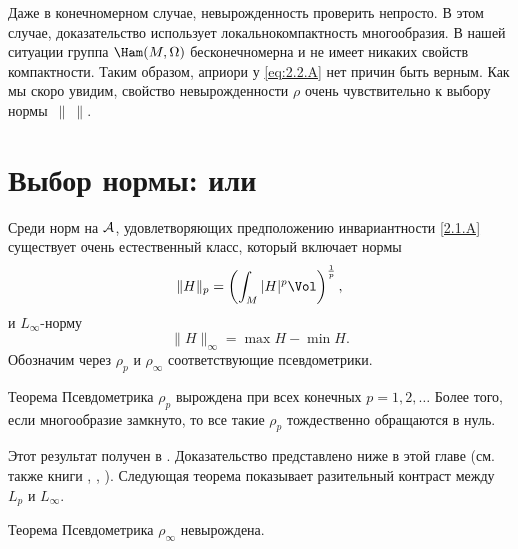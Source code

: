 Даже в конечномерном случае, невырожденность проверить непросто.
В этом случае, доказательство использует локальнокомпактность многообразия.
В нашей ситуации группа $\Ham (M, \Omega)$ бесконечномерна и не имеет никаких свойств компактности.
Таким образом, априори у \ref{eq:2.2.A} нет причин быть верным.
Как мы скоро увидим, свойство невырожденности $\rho$ очень чувствительно к выбору нормы~$\|\ \|$.

\section[\texorpdfstring{Выбор нормы: $L_p$ или $L_\infty$}{Выбор нормы: Lₚ или L∞}]{Выбор нормы:  или }

Среди норм на $\mathcal{A}$, удовлетворяющих предположению инвариантности
\ref{2.1.A} существует очень естественный класс, который включает
нормы \?{$L_p$, $p = 1, 2, 3,\dots$}{Почему только целые $p$. Не лучше
было бы написать $p\in[1,\infty)$?. То же и в теореме.}
\[\|H\|_p=\left(\int_M|H|^p\Vol\right)^{\frac1p},\]
и $L_\infty$-норму 
\[\|H\|_\infty = \max H - \min H.\]
Обозначим через $\rho_p$ и $\rho_\infty$ соответствующие псевдометрики.

\begin{thm}{Теорема}\label{2.3.A}
Псевдометрика $\rho_p$ вырождена при всех конечных $p = 1, 2,\dots$
Более того, если многообразие замкнуто, то все такие $\rho_p$ тождественно обращаются в нуль.
\end{thm}

Этот результат получен в \cite{EP}.
Доказательство представлено ниже в этой главе (см. также книги \cite{HZ}, \cite{MS}, \cite{AK}).
Следующая теорема показывает разительный контраст между $L_p$ и $L_\infty$.

\begin{thm}{Теорема}\label{2.3.B}
Псевдометрика $\rho_\infty$ невырождена.
\end{thm}

